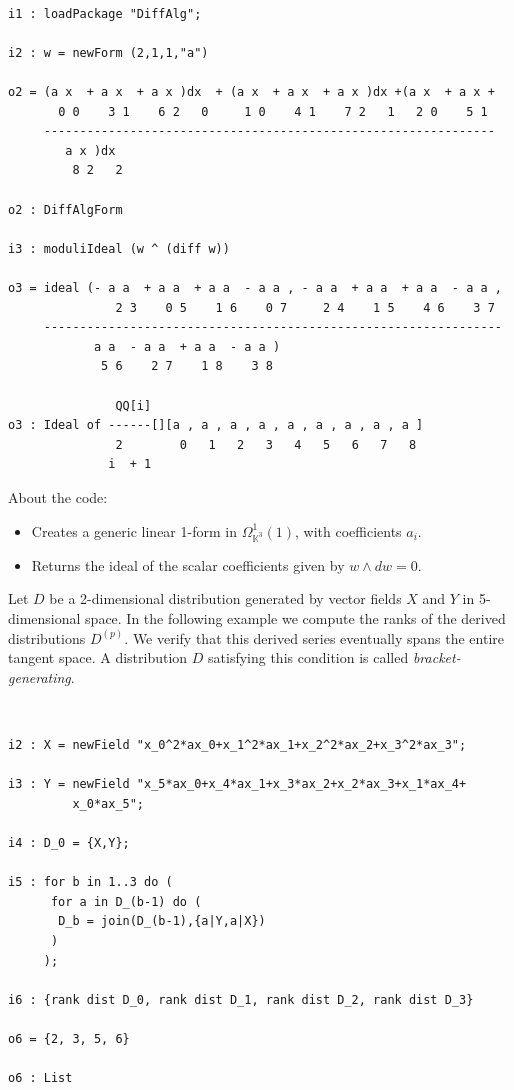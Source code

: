 \documentclass{amsart}
\theoremstyle{definition}
\def\KK{\mathbb{K}}
\begin{document}
\bigskip

{\tt\footnotesize
\begin{lstlisting}
i1 : loadPackage "DiffAlg";

i2 : w = newForm (2,1,1,"a")

o2 = (a x  + a x  + a x )dx  + (a x  + a x  + a x )dx +(a x  + a x +
       0 0    3 1    6 2   0     1 0    4 1    7 2   1   2 0    5 1    
     ---------------------------------------------------------------
        a x )dx
         8 2   2

o2 : DiffAlgForm

i3 : moduliIdeal (w ^ (diff w))

o3 = ideal (- a a  + a a  + a a  - a a , - a a  + a a  + a a  - a a ,
               2 3    0 5    1 6    0 7     2 4    1 5    4 6    3 7
     ----------------------------------------------------------------
            a a  - a a  + a a  - a a )
             5 6    2 7    1 8    3 8

               QQ[i]
o3 : Ideal of ------[][a , a , a , a , a , a , a , a , a ]
               2        0   1   2   3   4   5   6   7   8
              i  + 1
\end{lstlisting}
}

\noindent About the code:
\begin{itemize}
\item[\tt i2.]
Creates a generic linear 1-form in $\Omega^1_{\KK^3}(1)$, with coefficients $a_i$.
\item[\tt i3.]
Returns the ideal of the scalar coefficients given by 
$w \wedge d w = 0$.
\end{itemize}

\ex\label{ex3} Let $D$ be a 2-dimensional distribution generated by vector fields $X$ and $Y$ in 5-dimensional space.
In the following example we compute the ranks of the derived distributions $D^{(p)}$.
We verify that this derived series
eventually spans the entire tangent space. A distribution $D$ satisfying this
condition is called \emph{bracket-generating}.

\bigskip

{\tt\footnotesize
\begin{lstlisting}
i2 : X = newField "x_0^2*ax_0+x_1^2*ax_1+x_2^2*ax_2+x_3^2*ax_3";

i3 : Y = newField "x_5*ax_0+x_4*ax_1+x_3*ax_2+x_2*ax_3+x_1*ax_4+
         x_0*ax_5";

i4 : D_0 = {X,Y};

i5 : for b in 1..3 do (
      for a in D_(b-1) do (
       D_b = join(D_(b-1),{a|Y,a|X})
      )
     );

i6 : {rank dist D_0, rank dist D_1, rank dist D_2, rank dist D_3}

o6 = {2, 3, 5, 6}

o6 : List
\end{lstlisting}
}
\end{document}

